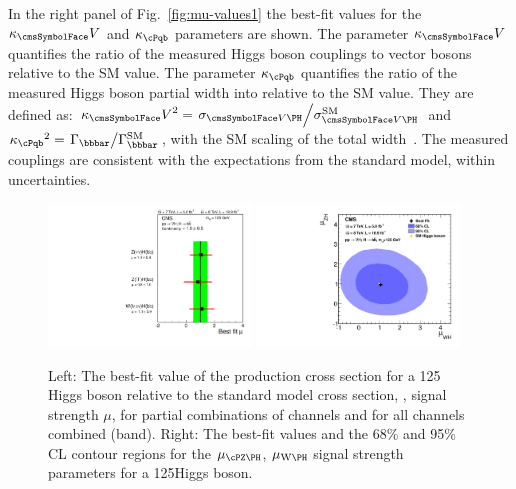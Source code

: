 \documentclass[12pt,twoside,a4paper,cmspaper,final,collab]{cms-tdr}
\begin{document}
In the right panel of Fig.~\ref{fig:mu-values1} the best-fit values
for the $\kappa_\Vvar$ and $\kappa_\cPqb$ parameters are shown. The parameter $\kappa_\Vvar$
quantifies the ratio of the measured Higgs boson couplings to vector
bosons relative to the SM value. The parameter $\kappa_\cPqb$ quantifies
the ratio of the measured Higgs
boson partial width into \bbbar relative to the SM value.
They are defined as:  ${\kappa_\Vvar}^2 =
\left.\sigma_{\VH}\middle/\sigma^{\mathrm{SM}}_{\VH}\right. $
and $ {\kappa_\cPqb}^2 = \left.\Gamma_{\bbbar}\middle/\Gamma^{\mathrm{SM}}_{\bbbar}\right. $,
with the SM scaling of the total
width~\cite{Heinemeyer:2013tqa}. The measured
couplings are consistent with the expectations from the standard
model, within uncertainties.





\begin{figure}[htbp]
  \begin{center}
\includegraphics[width=0.48\textwidth]{PRD_compatibility_Jul23}
\includegraphics[width=0.48\textwidth]{PRD_WH_ZH_2d_Sept11}
\caption{Left: The best-fit value of the production cross section for a 125\GeV
Higgs boson relative to the standard model cross section, \ie, signal
strength $\mu$, for partial
combinations of channels and for all channels combined (band). Right:
The best-fit values and the 68\% and 95\% CL
contour regions for the $\mu_{\ZH}$, $\mu_{\WH}$ signal strength parameters for a 125\GeV Higgs boson.}
    \label{fig:mu-values}
  \end{center}
\end{figure}
\end{document}
